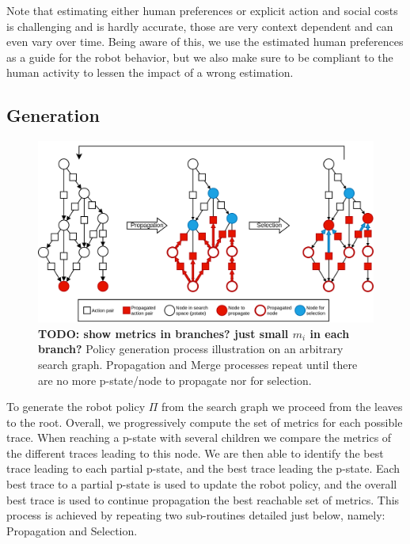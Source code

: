Note that estimating either human preferences or explicit action and social costs is challenging and is hardly accurate, those are very context dependent and can even vary over time.
Being aware of this, we use the estimated human preferences as a guide for the robot behavior, but we also make sure to be compliant to the human activity to lessen the impact of a wrong estimation. 

    \subsection{Generation}

\begin{figure}
    \includegraphics[width=\linewidth]{images/Chapter4/policy_generation.png}
    \caption{\textbf{TODO: show metrics in branches? just small $m_i$ in each branch?} Policy generation process illustration on an arbitrary search graph. Propagation and Merge processes repeat until there are no more p-state/node to propagate nor for selection.}
    \label{fig:policy_generation}
\end{figure}

To generate the robot policy $\Pi$ from the search graph we proceed from the leaves to the root. 
Overall, we progressively compute the set of metrics for each possible trace. When reaching a p-state with several children we compare the metrics of the different traces leading to this node. We are then able to identify the best trace leading to each partial p-state, and the best trace leading the p-state. Each best trace to a partial p-state is used to update the robot policy, and the overall best trace is used to continue propagation the best reachable set of metrics.
This process is achieved by repeating two sub-routines detailed just below, namely: Propagation and Selection. 

